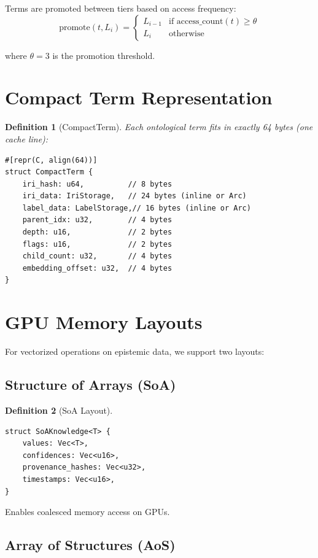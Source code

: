 \documentclass[11pt]{article}
\newtheorem{definition}{Definition}
\begin{document}
Terms are promoted between tiers based on access frequency:
\[
\text{promote}(t, L_i) =
\begin{cases}
L_{i-1} & \text{if access\_count}(t) \geq \theta \\
L_i & \text{otherwise}
\end{cases}
\]

where $\theta = 3$ is the promotion threshold.

\section{Compact Term Representation}

\begin{definition}[CompactTerm]
Each ontological term fits in exactly 64 bytes (one cache line):
\begin{verbatim}
#[repr(C, align(64))]
struct CompactTerm {
    iri_hash: u64,          // 8 bytes
    iri_data: IriStorage,   // 24 bytes (inline or Arc)
    label_data: LabelStorage,// 16 bytes (inline or Arc)
    parent_idx: u32,        // 4 bytes
    depth: u16,             // 2 bytes
    flags: u16,             // 2 bytes
    child_count: u32,       // 4 bytes
    embedding_offset: u32,  // 4 bytes
}
\end{verbatim}
\end{definition}

\section{GPU Memory Layouts}

For vectorized operations on epistemic data, we support two layouts:

\subsection{Structure of Arrays (SoA)}

\begin{definition}[SoA Layout]
\begin{verbatim}
struct SoAKnowledge<T> {
    values: Vec<T>,
    confidences: Vec<u16>,
    provenance_hashes: Vec<u32>,
    timestamps: Vec<u16>,
}
\end{verbatim}
\end{definition}

Enables coalesced memory access on GPUs.

\subsection{Array of Structures (AoS)}
\end{document}
